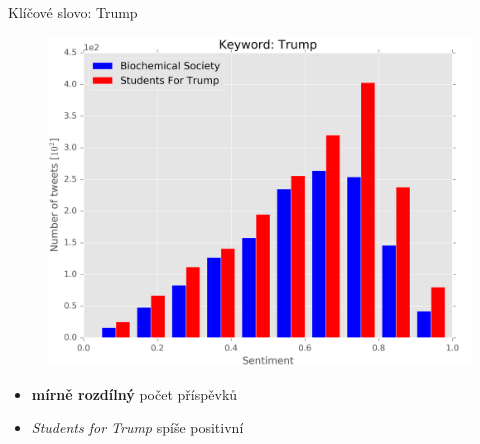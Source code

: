\documentclass[notheorems,12pt]{beamer}
\begin{document}
\begin{frame}{Klíčové slovo: Trump}
    \begin{figure}
        \centering
        \includegraphics[scale=0.37]{./Pics/trump.png}
    \end{figure}
    \vspace{-0.4cm}
    \begin{itemize}
        \item \textbf{mírně rozdílný} počet příspěvků
        \item \textit{Students for Trump} spíše positivní
    \end{itemize}
\end{frame}
\end{document}
